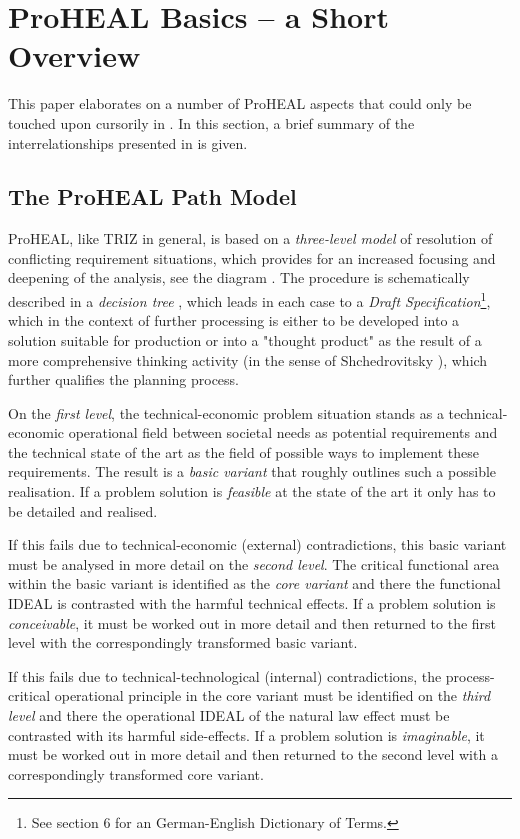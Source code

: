 \documentclass[11pt,a4paper]{article}
\begin{document}
\section{ProHEAL Basics -- a Short Overview}

This paper elaborates on a number of ProHEAL aspects that could only be
touched upon cursorily in \cite{ProHEAL-21}. In this section, a brief summary
of the interrelationships presented in \cite{ProHEAL-21} is given.

\subsection{The ProHEAL Path Model}

ProHEAL, like TRIZ in general, is based on a \emph{three-level model} of
resolution of conflicting requirement situations, which provides for an
increased focusing and deepening of the analysis, see the diagram
\cite[Appendix 1]{ProHEAL-21}. The procedure is schematically described in a
\emph{decision tree} \cite[Appendix 3]{ProHEAL-21}, which leads in each case
to a \emph{Draft Specification}\footnote{See section 6 for an German-English
  Dictionary of Terms.}, which in the context of further processing is either
to be developed into a solution suitable for production or into a "thought
product" as the result of a more comprehensive thinking activity (in the sense
of Shchedrovitsky \cite{Shchedrovitsky}), which further qualifies the planning
process.

On the \emph{first level}, the technical-economic problem situation stands as
a technical-economic operational field between societal needs as potential
requirements and the technical state of the art as the field of possible ways
to implement these requirements. The result is a \emph{basic variant} that
roughly outlines such a possible realisation. If a problem solution is
\emph{feasible} at the state of the art it only has to be detailed and
realised.

If this fails due to technical-economic (external) contradictions, this basic
variant must be analysed in more detail on the \emph{second level}. The
critical functional area within the basic variant is identified as the
\emph{core variant} and there the functional IDEAL is contrasted with the
harmful technical effects. If a problem solution is \emph{conceivable}, it
must be worked out in more detail and then returned to the first level with
the correspondingly transformed basic variant.

If this fails due to technical-technological (internal) contradictions, the
process-critical operational principle in the core variant must be identified
on the \emph{third level} and there the operational IDEAL of the natural law
effect must be contrasted with its harmful side-effects. If a problem solution
is \emph{imaginable}, it must be worked out in more detail and then returned
to the second level with a correspondingly transformed core variant.
\end{document}
